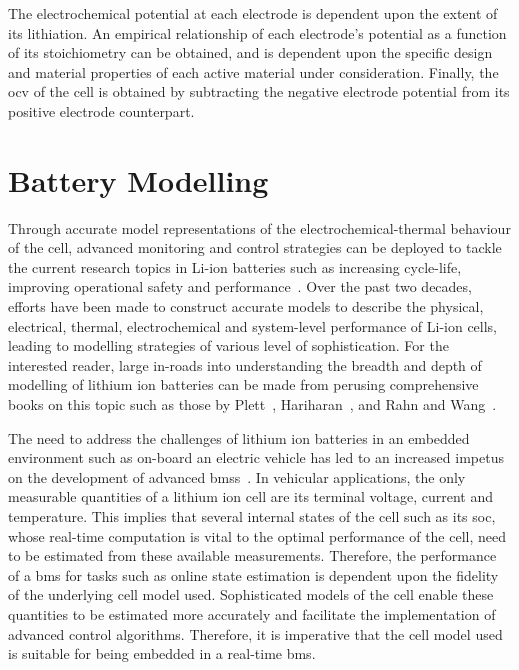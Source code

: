 The electrochemical potential at each electrode  is dependent upon the extent of
its  lithiation. An  empirical  relationship of  each  electrode's potential  as
a  function  of  its  stoichiometry  can be  obtained,  and  is  dependent  upon
the  specific design  and  material  properties of  each  active material  under
consideration. Finally, the \gls{ocv} of the cell is obtained by subtracting the
negative electrode potential from its positive electrode counterpart.


\section{Battery Modelling}

Through accurate model representations  of the electrochemical-thermal behaviour
of  the cell,  advanced monitoring  and control  strategies can  be deployed  to
tackle  the current  research  topics  in Li-ion  batteries  such as  increasing
cycle-life, improving operational  safety and performance~\cite{Plett2015}. Over
the past  two decades, efforts  have been made  to construct accurate  models to
describe  the physical,  electrical, thermal,  electrochemical and  system-level
performance  of  Li-ion  cells,  leading  to  modelling  strategies  of  various
level  of  sophistication.  For  the  interested  reader,  large  in-roads  into
understanding  the breadth  and  depth  of modelling  of  lithium ion  batteries
can  be  made   from  perusing  comprehensive  books  on  this   topic  such  as
those  by Plett~\cite{Plett2015},  Hariharan~\cite{Hariharan2017}, and  Rahn and
Wang~\cite{Rahn2013}.

The  need to  address the  challenges of  lithium ion  batteries in  an embedded
environment such as on-board an electric vehicle has led to an increased impetus
on  the development  of advanced  \glspl{bms}~\cite{Bergveld2002}. In  vehicular
applications,  the only  measurable quantities  of a  lithium ion  cell are  its
terminal voltage,  current and temperature.  This implies that  several internal
states of the  cell such as its \gls{soc}, whose  real-time computation is vital
to  the  optimal performance  of  the  cell, need  to  be  estimated from  these
available measurements. Therefore, the performance of a \gls{bms} for tasks such
as online state estimation is dependent upon the fidelity of the underlying cell
model  used. Sophisticated  models of  the cell  enable these  quantities to  be
estimated more accurately and facilitate  the implementation of advanced control
algorithms. Therefore, it is imperative that the cell model used is suitable for
being embedded in a real-time \gls{bms}.

